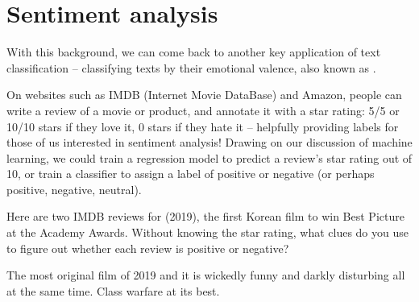 %



%

\section{Sentiment analysis}

With this background, we can come back to another key application of text classification -- classifying texts by their emotional valence, also known as .

On websites such as IMDB (Internet Movie DataBase) and Amazon, people can write a review of a movie or product, and  annotate it with a star rating: 5/5 or 10/10 stars if they love it, 0 stars if they hate it -- helpfully providing labels for those of us interested in sentiment analysis!  Drawing on our discussion of machine learning, we could train a regression model to predict a review's star rating out of 10, or train a classifier to assign a label of positive or negative (or perhaps positive, negative, neutral).

Here are two IMDB reviews for  (2019), the first Korean film to win Best Picture at the Academy Awards.  Without knowing the star rating, what clues do you use to figure out whether each review is positive or negative?

\ea The most original film of 2019 and it is wickedly funny and darkly disturbing all at the same time. Class warfare at its best.


